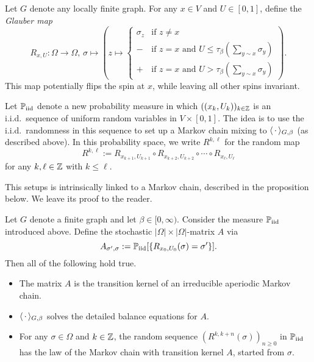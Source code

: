 \begin{definition}
    Let $G$ denote any locally finite graph.
    For any $x\in V$ and $U\in[0,1]$, define the \emph{Glauber map}
    \[
        R_{x,U}:\Omega\to\Omega,\,\sigma\mapsto
        \left(
            z\mapsto \begin{cases}
                \sigma_z&\text{if $z\neq x$}\\
                - &\text{if $z=x$ and $U\leq \tau_\beta(\sum_{y\sim x}\sigma_y)$}\\
                + &\text{if $z=x$ and $U>\tau_\beta(\sum_{y\sim x}\sigma_y)$}
            \end{cases} 
        \right).
    \]
    This map potentially flips the spin at $x$, while leaving all other spins invariant.
\end{definition}

\newcommand\Piid{\P_{\operatorname{iid}}}

Let $\Piid$ denote a new probability measure in which
 $((x_k,U_k))_{k\in\mathbb Z}$ is an i.i.d.\ sequence of
uniform random variables in $V\times[0,1]$.
The idea is to use the i.i.d.\ randomness in this sequence to set up a Markov chain
mixing to $\langle\,\cdot\,\rangle_{G,\beta}$ (as described above).
In this probability space, we write $R^{k,\ell}$ for the random map
\[
    R^{k,\ell}:=R_{x_{k+1},U_{k+1}}\circ R_{x_{k+2},U_{k+2}} \circ \cdots \circ R_{x_{\ell},U_{\ell}}
\]
for any $k,\ell\in\mathbb Z$ with $k\leq\ell$.

This setups is intrinsically linked to a Markov chain, described in the proposition below.
We leave its proof to the reader.

\begin{proposition}
    Let $G$ denote a finite graph and let $\beta\in[0,\infty)$.
    Consider the measure $\Piid$ introduced above.
    Define the stochastic $|\Omega|\times|\Omega|$-matrix $A$ via
    \[
        A_{\sigma',\sigma}:=\Piid[\{R_{x_0,U_0}(\sigma)=\sigma'\}].
    \]
    Then all of the following hold true.
    \begin{itemize}
        \item The matrix $A$ is the transition kernel of an irreducible aperiodic Markov chain.
        \item $\langle\,\cdot\,\rangle_{G,\beta}$ solves the detailed balance equations for $A$.
        \item For any $\sigma\in\Omega$ and $k\in\mathbb Z$, the random sequence
        \(
            (R^{k,k+n}(\sigma))_{n\geq 0}
        \)
        in $\Piid$
        has the law of the Markov chain with transition kernel $A$, started from $\sigma$.
    \end{itemize}
\end{proposition}

